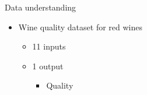 \begin{frame}{Data understanding}
    \begin{itemize}
        \item Wine quality dataset for red wines
        \begin{itemize}
            \item 11 inputs
            \item 1 output
            \begin{itemize}
                \item Quality
            \end{itemize}
        \end{itemize}
    \end{itemize}
\end{frame}